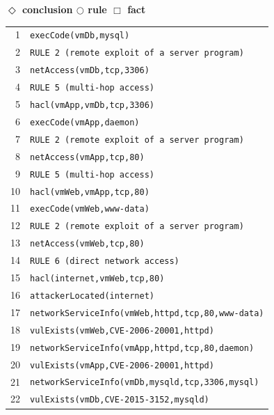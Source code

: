 \scriptsize
\textbf{$\Diamond$ conclusion \quad $\bigcirc$ rule \quad $\Box$ fact}
\vspace{2pt}\\
\begin{tabular}{rl}
1 & \texttt{execCode(vmDb,mysql)} \\
2 & \texttt{RULE 2 (remote exploit of a server program)} \\
3 & \texttt{netAccess(vmDb,tcp,3306)} \\
4 & \texttt{RULE 5 (multi-hop access)} \\
5 & \texttt{hacl(vmApp,vmDb,tcp,3306)} \\
6 & \texttt{execCode(vmApp,daemon)} \\
7 & \texttt{RULE 2 (remote exploit of a server program)} \\
8 & \texttt{netAccess(vmApp,tcp,80)} \\
9 & \texttt{RULE 5 (multi-hop access)} \\
10 & \texttt{hacl(vmWeb,vmApp,tcp,80)} \\
11 & \texttt{execCode(vmWeb,www-data)} \\
12 & \texttt{RULE 2 (remote exploit of a server program)} \\
13 & \texttt{netAccess(vmWeb,tcp,80)} \\
14 & \texttt{RULE 6 (direct network access)} \\
15 & \texttt{hacl(internet,vmWeb,tcp,80)} \\
16 & \texttt{attackerLocated(internet)} \\
17 & \texttt{networkServiceInfo(vmWeb,httpd,tcp,80,www-data)} \\
18 & \texttt{vulExists(vmWeb,CVE-2006-20001,httpd)} \\
19 & \texttt{networkServiceInfo(vmApp,httpd,tcp,80,daemon)} \\
20 & \texttt{vulExists(vmApp,CVE-2006-20001,httpd)} \\
21 & \texttt{networkServiceInfo(vmDb,mysqld,tcp,3306,mysql)} \\
22 & \texttt{vulExists(vmDb,CVE-2015-3152,mysqld)} \\
\end{tabular}